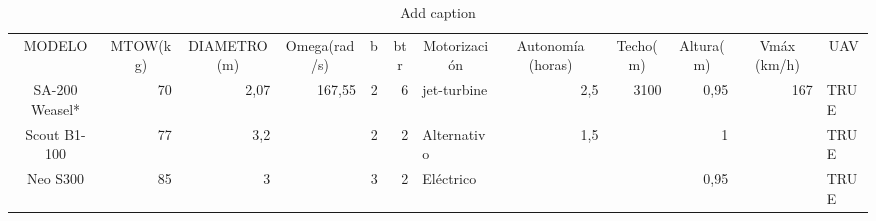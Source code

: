 \begin{table}[htbp]
	\centering
	\caption{Add caption}
	\begin{tabular}{|c|r|r|r|r|r|l|r|r|r|r|l|}
		\rowcolor[rgb]{ .22,  .337,  .137} \textcolor[rgb]{ 1,  1,  1}{MODELO} & \multicolumn{1}{c|}{\textcolor[rgb]{ 1,  1,  1}{MTOW(kg)}} & \multicolumn{1}{c|}{\textcolor[rgb]{ 1,  1,  1}{DIAMETRO(m)}} & \multicolumn{1}{c|}{\textcolor[rgb]{ 1,  1,  1}{Omega(rad/s)}} & \multicolumn{1}{c|}{\textcolor[rgb]{ 1,  1,  1}{b}} & \multicolumn{1}{c|}{\textcolor[rgb]{ 1,  1,  1}{btr}} & \multicolumn{1}{c|}{\textcolor[rgb]{ 1,  1,  1}{Motorización}} & \multicolumn{1}{c|}{\textcolor[rgb]{ 1,  1,  1}{Autonomía (horas)}} & \multicolumn{1}{c|}{\textcolor[rgb]{ 1,  1,  1}{Techo(m)}} & \multicolumn{1}{c|}{\textcolor[rgb]{ 1,  1,  1}{Altura(m)}} & \multicolumn{1}{c|}{\textcolor[rgb]{ 1,  1,  1}{Vmáx (km/h)}} & \multicolumn{1}{c|}{\textcolor[rgb]{ 1,  1,  1}{UAV}} \\
		\rowcolor[rgb]{ .329,  .506,  .208} \textcolor[rgb]{ 1,  1,  1}{SA-200 Weasel*} & \cellcolor[rgb]{ .659,  .816,  .553}70 & \cellcolor[rgb]{ .659,  .816,  .553}2,07 & \cellcolor[rgb]{ .659,  .816,  .553}167,55 & \cellcolor[rgb]{ .659,  .816,  .553}2 & \cellcolor[rgb]{ .659,  .816,  .553}6 & \cellcolor[rgb]{ .659,  .816,  .553}jet-turbine & \cellcolor[rgb]{ .659,  .816,  .553}2,5 & \cellcolor[rgb]{ .659,  .816,  .553}3100 & \cellcolor[rgb]{ .659,  .816,  .553}0,95 & \cellcolor[rgb]{ .659,  .816,  .553}167 & \cellcolor[rgb]{ .659,  .816,  .553}TRUE \\
		\midrule
		\rowcolor[rgb]{ .329,  .506,  .208} \textcolor[rgb]{ 1,  1,  1}{Scout B1-100} & \cellcolor[rgb]{ .659,  .816,  .553}77 & \cellcolor[rgb]{ .659,  .816,  .553}3,2 & \cellcolor[rgb]{ 1,  1,  0} & \cellcolor[rgb]{ .659,  .816,  .553}2 & \cellcolor[rgb]{ .659,  .816,  .553}2 & \cellcolor[rgb]{ .659,  .816,  .553}Alternativo & \cellcolor[rgb]{ .659,  .816,  .553}1,5 & \multicolumn{1}{l|}{\cellcolor[rgb]{ .659,  .816,  .553}\newline{}} & \cellcolor[rgb]{ .659,  .816,  .553}1 & \multicolumn{1}{l|}{\cellcolor[rgb]{ 1,  1,  0}\newline{}} & \cellcolor[rgb]{ .659,  .816,  .553}TRUE \\
		\midrule
		\rowcolor[rgb]{ .329,  .506,  .208} \textcolor[rgb]{ 1,  1,  1}{Neo S300} & \cellcolor[rgb]{ .659,  .816,  .553}85 & \cellcolor[rgb]{ .659,  .816,  .553}3 & \cellcolor[rgb]{ 1,  1,  0} & \cellcolor[rgb]{ .659,  .816,  .553}3 & \cellcolor[rgb]{ .659,  .816,  .553}2 & \cellcolor[rgb]{ .659,  .816,  .553}Eléctrico & \cellcolor[rgb]{ 1,  1,  0} & \cellcolor[rgb]{ 1,  1,  0} & \cellcolor[rgb]{ .659,  .816,  .553}0,95 & \cellcolor[rgb]{ 1,  1,  0} & \cellcolor[rgb]{ .659,  .816,  .553}TRUE \\

\end{tabular}
\end{table}
